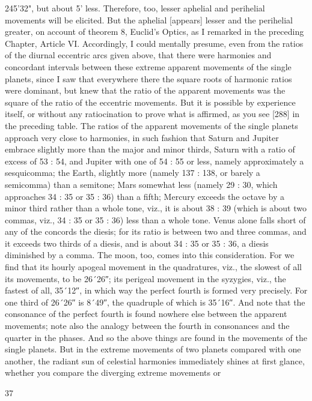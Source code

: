 \documentclass{article}
\begin{document}
245'32", but about 5' less. Therefore, too, lesser aphelial and perihelial
movements will be elicited. But the aphelial [appears] lesser and the
perihelial greater, on account of theorem 8, Euclid's Optics, as I
remarked in the preceding Chapter, Article VI.
Accordingly, I could mentally presume, even from the ratios of the
diurnal eccentric arcs given above, that there were harmonies and
concordant intervals between these extreme apparent movements of the
single planets, since I saw that everywhere there the square roots of
harmonic ratios were dominant, but knew that the ratio of the apparent
movements was the square of the ratio of the eccentric movements. But
it is possible by experience itself, or without any ratiocination to prove
what is affirmed, as you see [288] in the preceding table. The ratios of
the apparent movements of the single planets approach very close to
harmonies, in such fashion that Saturn and Jupiter embrace slightly
more than the major and minor thirds, Saturn with a ratio of excess of 53
: 54, and Jupiter with one of 54 : 55 or less, namely approximately a
sesquicomma; the Earth, slightly more (namely 137 : 138, or barely a
semicomma) than a semitone; Mars somewhat less (namely 29 : 30,
which approaches 34 : 35 or 35 : 36) than a fifth; Mercury exceeds the
octave by a minor third rather than a whole tone, viz., it is about 38 : 39
(which is about two commas, viz., 34 : 35 or 35 : 36) less than a whole
tone. Venus alone falls short of any of the concords the diesis; for its
ratio is between two and three commas, and it exceeds two thirds of a
diesis, and is about 34 : 35 or 35 : 36, a diesis diminished by a comma.
The moon, too, comes into this consideration. For we find that its hourly
apogeal movement in the quadratures, viz., the slowest of all its
movements, to be 26´26″; its perigeal movement in the syzygies, viz.,
the fastest of all, 35´12″, in which way the perfect fourth is formed very
precisely. For one third of 26´26″ is 8´49″, the quadruple of which is
35´16″. And note that the consonance of the perfect fourth is found
nowhere else between the apparent movements; note also the analogy
between the fourth in consonances and the quarter in the phases. And so
the above things are found in the movements of the single planets.
But in the extreme movements of two planets compared with one
another, the radiant sun of celestial harmonies immediately shines at
first glance, whether you compare the diverging extreme movements or


37
\end{document}
